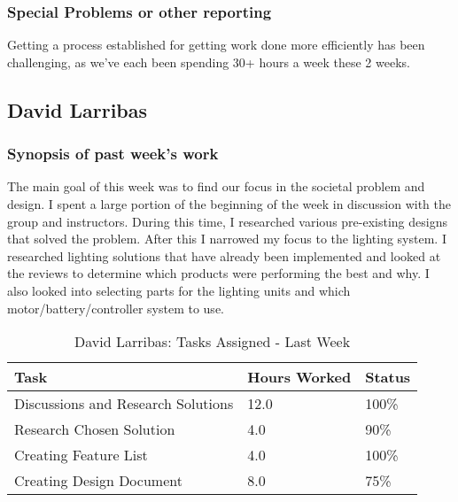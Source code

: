 \documentclass[12pt,article,compsoc]{IEEEtran}
\begin{document}
	\subsubsection*{Special Problems or other reporting}
	Getting a process established for getting work done more efficiently has been challenging, as we've each been spending 30+ hours a week these 2 weeks.

\subsection{David Larribas}

	\subsubsection*{Synopsis of past week's work}

	The main goal of this week was to find our focus in the societal problem and design. I spent a large portion
    of the beginning of the week in discussion with the group and instructors. During this time, I researched
    various pre-existing designs that solved the problem. After this I narrowed my focus to the lighting system. 
    I researched lighting solutions that have already been implemented and looked at the reviews to determine which 
    products were performing the best and why. I also looked into selecting parts for the lighting units and which
    motor/battery/controller system to use.  

	\begin{table}[ht]
	\renewcommand{\arraystretch}{1.3}
		\caption{David Larribas: Tasks Assigned - Last Week}
		
		\label{Summary of David Larribas' activities: last week}
		
		\centering
		\begin{tabular}{p{5.5cm}|p{1cm}|p{1cm}}
		\hline
		\bfseries 	Task		 	                        	& \bfseries Hours Worked	& \bfseries Status	\\
		\hline\hline
					Discussions and Research Solutions			& 12.0				    	& 100\%				\\	
					Research Chosen Solution					& 4.0						& 90\%              \\
                    Creating Feature List                       & 4.0                       & 100\%             \\
                    Creating Design Document                    & 8.0                       & 75\%              \\	
		\hline
		\end{tabular}
	\end{table}
\end{document}
